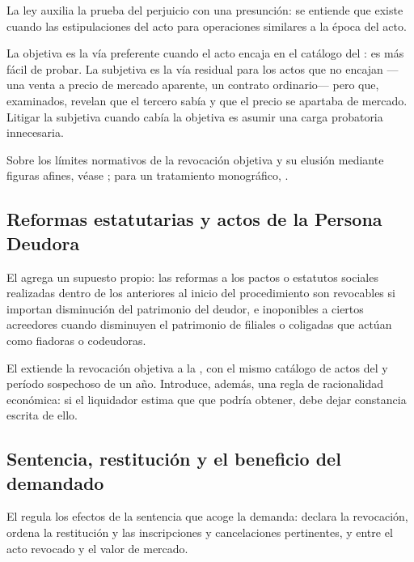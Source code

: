 La ley auxilia la prueba del perjuicio con una presunción: se entiende que existe cuando las
estipulaciones del acto  para
operaciones similares a la época del acto.

\begin{foco}
La objetiva es la vía preferente cuando el acto encaja en el catálogo del : es más
fácil de probar. La subjetiva es la vía residual para los actos que no encajan ---una venta a
precio de mercado aparente, un contrato ordinario--- pero que, examinados, revelan que el
tercero sabía y que el precio se apartaba de mercado. Litigar la subjetiva cuando cabía la
objetiva es asumir una carga probatoria innecesaria.
\end{foco}

Sobre los límites normativos de la revocación objetiva y su elusión mediante figuras afines,
véase \textcite{doc-revocacion-objetiva}; para un tratamiento monográfico,
\textcite{doc-acciones-revocatorias}.

\subsection{Reformas estatutarias y actos de la Persona Deudora}

El  agrega un supuesto propio: las reformas a los pactos o estatutos sociales
realizadas dentro de los  anteriores al inicio del procedimiento son
revocables si importan disminución del patrimonio del deudor, e inoponibles a ciertos
acreedores cuando disminuyen el patrimonio de filiales o coligadas que actúan como fiadoras o
codeudoras.

El  extiende la revocación objetiva a la \personadeudora{}, con el mismo catálogo de
actos del  y período sospechoso de un año. Introduce, además, una regla de
racionalidad económica: si el liquidador estima que  que podría obtener, debe dejar constancia escrita de ello.

\subsection{Sentencia, restitución y el beneficio del demandado}

El  regula los efectos de la sentencia que acoge la demanda: declara la revocación,
ordena la restitución y las inscripciones y cancelaciones pertinentes, y  entre el acto revocado y el valor de mercado.

